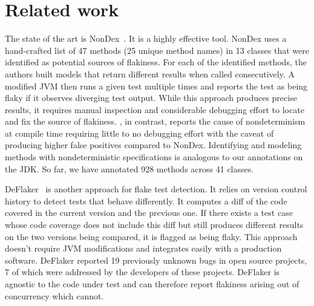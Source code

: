 \section{Related work}\label{sec:related}


The state of the art is NonDex~\cite{nondex}.  It is a highly effective tool.
NonDex uses a hand-crafted list of 47 methods (25 unique method names)
in 13 classes that were identified as potential sources of flakiness. 
For each of the identified methods, the authors built models that
return different results when called consecutively. A modified JVM then
runs a given test multiple times and reports the test as being flaky if it observes
diverging test output. While this approach produces precise results, it requires manual inspection
and considerable debugging effort to locate and fix the source of flakiness. \TheDeterminismChecker, in
contrast, reports the cause of nondeterminism at compile time requiring little to no debugging effort with the
caveat of producing higher false positives compared to NonDex. 
Identifying and modeling methods with nondeterministic
specifications is analogous to our annotations on the JDK\@. So far, we have annotated
928 methods across 41 classes.

DeFlaker~\cite{deflaker} is another approach for flake test detection. It relies on
version control history to detect tests that behave differently. It computes a diff of the code covered
in the current version and the previous one. If there exists a test case whose code coverage does not include
this diff but still produces different results on the two versions being compared, it is flagged as being flaky.
This approach doesn't require JVM modifications
and integrates easily with a production software. DeFlaker reported 19 previously unknown bugs
in open source projects, 7 of which were addressed by the developers of these projects. DeFlaker is agnostic
to the code under test and can therefore report flakiness arising out of concurrency which \TheDeterminismChecker cannot.



